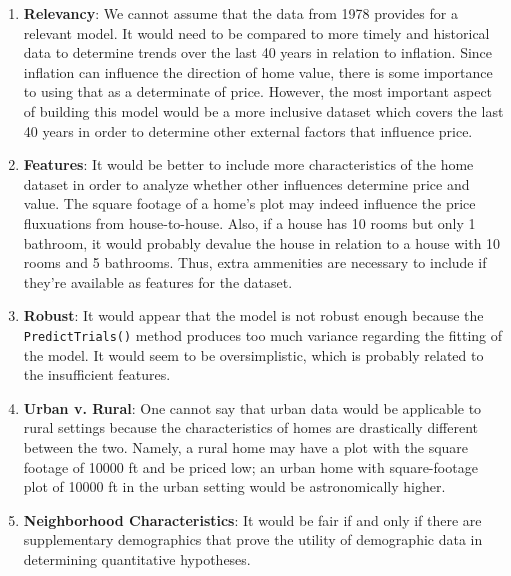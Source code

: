 \documentclass[11pt]{article}
\providecommand{\tightlist}{%
      \setlength{\itemsep}{0pt}\setlength{\parskip}{0pt}}
\begin{document}
\begin{enumerate}
\def\labelenumi{\arabic{enumi}.}
\tightlist
\item
  \textbf{Relevancy}: We cannot assume that the data from 1978 provides
  for a relevant model. It would need to be compared to more timely and
  historical data to determine trends over the last 40 years in relation
  to inflation. Since inflation can influence the direction of home
  value, there is some importance to using that as a determinate of
  price. However, the most important aspect of building this model would
  be a more inclusive dataset which covers the last 40 years in order to
  determine other external factors that influence price.
\item
  \textbf{Features}: It would be better to include more characteristics
  of the home dataset in order to analyze whether other influences
  determine price and value. The square footage of a home's plot may
  indeed influence the price fluxuations from house-to-house. Also, if a
  house has 10 rooms but only 1 bathroom, it would probably devalue the
  house in relation to a house with 10 rooms and 5 bathrooms. Thus,
  extra ammenities are necessary to include if they're available as
  features for the dataset.
\item
  \textbf{Robust}: It would appear that the model is not robust enough
  because the \texttt{PredictTrials()} method produces too much variance
  regarding the fitting of the model. It would seem to be
  oversimplistic, which is probably related to the insufficient
  features.
\item
  \textbf{Urban v. Rural}: One cannot say that urban data would be
  applicable to rural settings because the characteristics of homes are
  drastically different between the two. Namely, a rural home may have a
  plot with the square footage of 10000 ft and be priced low; an urban
  home with square-footage plot of 10000 ft in the urban setting would
  be astronomically higher.
\item
  \textbf{Neighborhood Characteristics}: It would be fair if and only if
  there are supplementary demographics that prove the utility of
  demographic data in determining quantitative hypotheses.
\end{enumerate}


    
    
    
    
\end{document}
